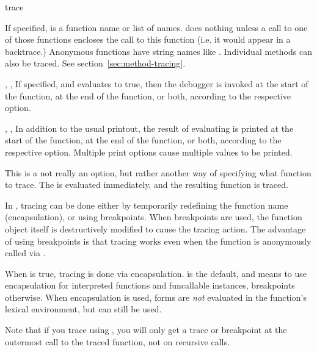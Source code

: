 \begin{defmac}{}{trace}{%
    }
\begin{Lentry}
  \item[\kwd{wherein} \var{names}] If specified,  is a
    function name or list of names.   does nothing unless
    a call to one of those functions encloses the call to this
    function (i.e. it would appear in a backtrace.)  Anonymous
    functions have string names like .  Individual
    methods can also be traced.  See section~\ref{sec:method-tracing}.
  
  \item[\kwd{break} \var{form}, \kwd{break-after} \var{form},
    \kwd{break-all} \var{form}] If specified, and  evaluates
    to true, then the debugger is invoked at the start of the
    function, at the end of the function, or both, according to the
    respective option.
    
  \item[\kwd{print} \var{form}, \kwd{print-after} \var{form},
    \kwd{print-all} \var{form}] In addition to the usual printout, the
    result of evaluating  is printed at the start of the
    function, at the end of the function, or both, according to the
    respective option.  Multiple print options cause multiple values
    to be printed.
    
  \item[\kwd{function} \var{function-form}] This is a not really an
    option, but rather another way of specifying what function to
    trace.  The  is evaluated immediately, and the
    resulting function is traced.
    
  \item[\kwd{encapsulate \mgroup{:default | t | nil}}] In \cmucl,
    tracing can be done either by temporarily redefining the function
    name (encapsulation), or using breakpoints.  When breakpoints are
    used, the function object itself is destructively modified to
    cause the tracing action.  The advantage of using breakpoints is
    that tracing works even when the function is anonymously called
    via .
  
    When  is true, tracing is done via encapsulation.
     is the default, and means to use encapsulation for
    interpreted functions and funcallable instances, breakpoints
    otherwise.  When encapsulation is used, forms are {\it not}
    evaluated in the function's lexical environment, but
     can still be used.

    Note that if you trace using , you will
    only get a trace or breakpoint at the outermost call to the traced
    function, not on recursive calls.


\end{Lentry}
\end{defmac}
